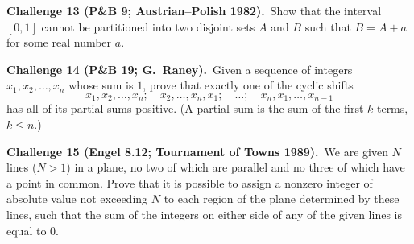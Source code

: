\documentclass[10pt]{scrartcl}
\begin{document}
\begin{prob}\textbf{Challenge 13 (P\&B 9; Austrian--Polish 1982).}\ Show that the interval $[0, 1]$ cannot be partitioned into two disjoint sets $A$ and $B$ such that $B = A + a$ for some real number $a$.\end{prob}

\begin{prob}\textbf{Challenge 14 (P\&B 19; G.~Raney).}\ Given a sequence of integers $x_1, x_2, \dots, x_n$ whose sum is $1$, prove that exactly one of the cyclic shifts
\[ x_1, x_2, \dots, x_n; \quad x_2, \dots, x_n, x_1; \quad \dots; \quad x_n, x_1, \dots, x_{n-1} \]
has all of its partial sums positive. (A partial sum is the sum of the first $k$ terms, $k \leq n$.)\end{prob}

\begin{prob}\textbf{Challenge 15 (Engel 8.12; Tournament of Towns 1989).}\ We are given $N$ lines ($N > 1$) in a plane, no two of which are parallel and no three of which have a point in common. Prove that it is possible to assign a nonzero integer of absolute value not exceeding $N$ to each region of the plane determined by these lines, such that the sum of the integers on either side of any of the given lines is equal to $0$.\end{prob}
\end{document}
